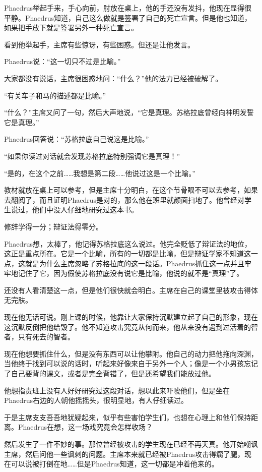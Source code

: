 \documentclass[UTF8]{article}
\begin{document}
\par Phaedrus举起手来，手心向前，肘放在桌上，他的手还没有发抖，他现在显得很平静。Phaedrus知道，自己这么做就是签署了自己的死亡宣言。但是他也知道，如果把手放下就是签署另外一种死亡宣言。
\par 看到他举起手，主席有些惊讶，有些困惑。但还是让他发言。
\par Phaedrus说：“这一切只不过是比喻。”
\par 大家都没有说话，主席很困惑地问：“什么？”他的法力已经被破解了。
\par “有关车子和马的描述都是比喻。”
\par “什么？”主席又问了一句，然后大声地说，“它是真理。苏格拉底曾经向神明发誓它是真理。”
\par Phaedrus回答说：“苏格拉底自己说这是比喻。”
\par “如果你读过对话就会发现苏格拉底特别强调它是真理！”
\par “是的，在这个之前……我想是第二段……他说过这是一个比喻。”
\par 教材就放在桌上可以参考，但是主席十分明白，在这个节骨眼不可以去参考，如果去翻阅了，而且证明Phaedrus是对的，那么他在班里就颜面扫地了。他曾经对学生说过，他们中没人仔细地研究过这本书。
\par 修辞学得一分；辩证法得零分。
\par Phaedrus想，太棒了，他记得苏格拉底这么说过。他完全贬低了辩证法的地位，这正是重点所在。它是一个比喻，所有的一切都是比喻，但是辩证学家不知道这一点，这就是为什么主席忽略了苏格拉底的这一段话。Phaedrus抓住这一点并且牢牢地记住了它，因为假使苏格拉底没有说它是比喻，他说的就不是“真理”了。
\par 还没有人看清楚这一点，但是他们很快就会明白。主席在自己的课堂里被攻击得体无完肤。
\par 现在他无话可说。刚上课的时候，他靠让大家保持沉默建立起了自己的形象，现在这沉默反倒把他给毁了。他不知道攻击究竟从何而来，他从来没有遇到过活着的智者，只有死去的智者。
\par 现在他想要抓住什么，但是没有东西可以让他攀附。他自己的动力把他拖向深渊，当他终于找到可以说的话时，听起来好像来自于另外一个人；像是一个小男孩忘记了自己要背的课文，或者是完全背错了，但是还希望我们能放过他。
\par 他想指责班上没有人好好研究过这段对话，想以此来吓唬他们，但是坐在Phaedrus右边的人朝他摇摇头，很明显地，有人仔细读过。
\par 于是主席支支吾吾地犹疑起来，似乎有些害怕学生们，也想在心理上和他们保持距离。Phaedrus在想，这一场戏究竟会怎样收场？
\par 然后发生了一件不妙的事。那位曾经被攻击的学生现在已经不再天真。他开始嘲讽主席，然后问他一些讽刺的问题。主席本来就已经被Phaedrus攻击得瘸了腿，现在可以说被打倒在地……但是Phaedrus知道，这一切都是冲着他来的。
\end{document}
